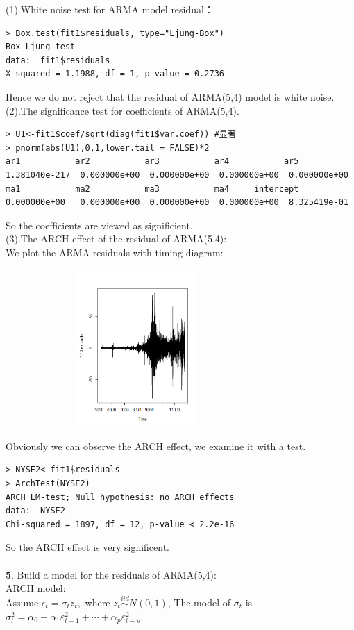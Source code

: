 \documentclass[twoside,11pt]{article}
\begin{document}
\noindent (1).White noise test for ARMA model residual：
\begin{verbatim}
> Box.test(fit1$residuals, type="Ljung-Box") 
Box-Ljung test
data:  fit1$residuals
X-squared = 1.1988, df = 1, p-value = 0.2736
\end{verbatim}
Hence we do not reject that the residual of ARMA(5,4) model is white noise.\\

\noindent (2).The significance test for coefficients of ARMA(5,4).
\begin{verbatim}
> U1<-fit1$coef/sqrt(diag(fit1$var.coef)) #显著
> pnorm(abs(U1),0,1,lower.tail = FALSE)*2
ar1           ar2           ar3           ar4           ar5                 
1.381040e-217  0.000000e+00  0.000000e+00  0.000000e+00  0.000000e+00
ma1           ma2           ma3           ma4     intercept
0.000000e+00   0.000000e+00  0.000000e+00  0.000000e+00  8.325419e-01
\end{verbatim}

So the coefficients are viewed as significient.\\

\noindent (3).The ARCH effect of the residual of ARMA(5,4):\\
We plot the ARMA residuals with timing diagram:
\begin {figure}[h]
\centering
\includegraphics[width=8cm,height=6cm]{NYSE_res1.png}
\end {figure}
\noindent Obviously we can observe the ARCH effect, we examine it with a test.
\begin{verbatim}
> NYSE2<-fit1$residuals
> ArchTest(NYSE2)
ARCH LM-test; Null hypothesis: no ARCH effects
data:  NYSE2
Chi-squared = 1897, df = 12, p-value < 2.2e-16
\end{verbatim}
So the ARCH effect is very significent.\\
\\
\noindent \textbf{5}. Build a model for the residuals of ARMA(5,4):\\
ARCH model:\\
Assume $\epsilon_{t}=\sigma_{t} z_{t},$ where $z_{t} \overset{iid}\sim  N(0,1)$, The model of $\sigma_{t}$ is
$\sigma_{t}^{2}=\alpha_{0}+\alpha_{1} \varepsilon_{t-1}^{2}+\cdots+\alpha_{p} \varepsilon_{t-p}^{2}.$
\end{document}
